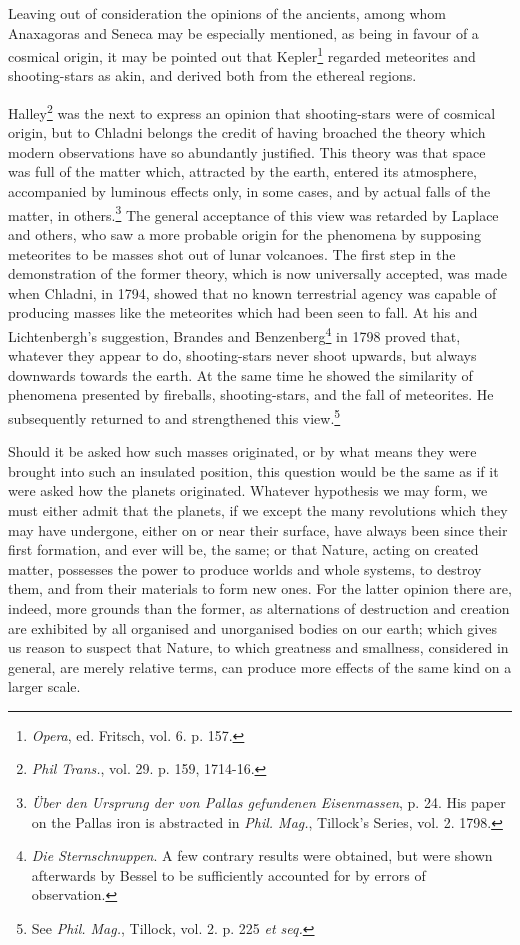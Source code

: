 \documentclass[a4paper, 12pt, oneside, polutonikogreek, english]{article}
\begin{document}
Leaving out of consideration the opinions of the ancients, among whom Anaxagoras and Seneca may be especially mentioned, as being in favour of a cosmical origin, it may be pointed out that Kepler\footnote{\emph{Opera}, ed. Fritsch, vol. 6. p. 157.} regarded meteorites and shooting-stars as akin, and derived both from the ethereal regions.

Halley\footnote{\emph{Phil Trans.}, vol. 29. p. 159, 1714-16.} was the next to express an opinion that shooting-stars were of cosmical origin, but to Chladni belongs the credit of having broached the theory which modern observations have so abundantly justified. This theory was that space was full of the matter which, attracted by the earth, entered its atmosphere, accompanied by luminous effects only, in some cases, and by actual falls of the matter, in others.\footnote{\emph{Über den Ursprung der von Pallas gefundenen Eisenmassen}, p. 24. His paper on the Pallas iron is abstracted in \emph{Phil. Mag.}, Tillock's Series, vol. 2. 1798.} The general acceptance of this view was retarded by Laplace and others, who saw a more probable origin for the phenomena by supposing meteorites to be masses shot out of lunar volcanoes. The first step in the demonstration of the former theory, which is now universally accepted, was made when Chladni, in 1794, showed that no known terrestrial agency was capable of producing masses like the meteorites which had been seen to fall. At his and Lichtenbergh's suggestion, Brandes and Benzenberg\footnote{\emph{Die Sternschnuppen}. A few contrary results were obtained, but were shown afterwards by Bessel to be sufficiently accounted for by errors of observation.} in 1798 proved that, whatever they appear to do, shooting-stars never shoot upwards, but always downwards towards the earth. At the same time he showed the similarity of phenomena presented by fireballs, shooting-stars, and the fall of meteorites. He subsequently returned to and strengthened this view.\footnote{See \emph{Phil. Mag.}, Tillock, vol. 2. p. 225 \emph{et seq.}}

Should it be asked how such masses originated, or by what means they were brought into such an insulated position, this question would be the same as if it were asked how the planets originated. Whatever hypothesis we may form, we must either admit that the planets, if we except the many revolutions which they may have undergone, either on or near their surface, have always been since their first formation, and ever will be, the same; or that Nature, acting on created matter, possesses the power to produce worlds and whole systems, to destroy them, and from their materials to form new ones. For the latter opinion there are, indeed, more grounds than the former, as alternations of destruction and creation are exhibited by all organised and unorganised bodies on our earth; which gives us reason to suspect that Nature, to which greatness and smallness, considered in general, are merely relative terms, can produce more effects of the same kind on a larger scale.
\end{document}

